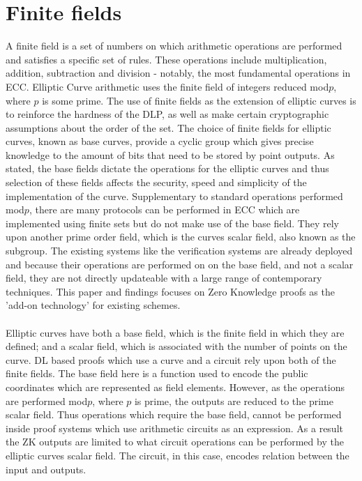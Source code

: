 \documentclass{article}
\begin{document}
\section{Finite fields}
A finite field is a set of numbers on which arithmetic operations are performed and satisfies a specific set of rules. These operations include multiplication, addition, subtraction and division - notably, the most fundamental operations in ECC. Elliptic Curve arithmetic uses the finite field of integers reduced mod$p$, where $p$ is some prime. The use of finite fields as the extension of elliptic curves is to reinforce the hardness of the DLP, as well as make certain cryptographic assumptions about the order of the set. The choice of finite fields for elliptic curves, known as base curves, provide a cyclic group which gives precise knowledge to the amount of bits that need to be stored by point outputs. As stated, the base fields dictate the operations for the elliptic curves and thus selection of these fields affects the security, speed and simplicity of the implementation of the curve. Supplementary to standard operations performed mod$p$, there are many protocols can be performed in ECC which are implemented using finite sets but do not make use of the base field. They rely upon another prime order field, which is the curves scalar field, also known as the subgroup.  The existing systems like the verification systems are already deployed and because their operations are performed on on the base field, and not a scalar field, they are not directly updateable with a large range of contemporary techniques. This paper and findings focuses on Zero Knowledge  proofs as the 'add-on technology' for existing schemes. \\\\ Elliptic curves have both a base field, which is the finite field in which they are defined; and a scalar field, which is associated with the number of points on the curve. DL based proofs which use a curve and a circuit rely upon both of the finite fields. The base field here is a function used to encode the public coordinates which are represented as field elements. However, as the operations are performed mod$p$, where $p$ is prime,  the outputs are reduced to the prime scalar field. Thus operations which require the base field, cannot be performed inside proof systems which use arithmetic circuits as an expression. As a result the ZK outputs are limited to what circuit operations can be performed by the elliptic curves scalar field. The circuit, in this case, encodes relation between the input and outputs.
\end{document}
